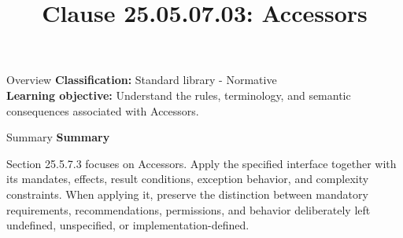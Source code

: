 \documentclass[10pt,letterpaper]{article}
\title{Clause 25.05.07.03: Accessors}
\author{}
\date{}
\begin{document}
\maketitle
\begin{CornellOverviewBox}{Overview}
\textbf{Classification:} Standard library - Normative\\[2pt]
\textbf{Learning objective:} Understand the rules, terminology, and semantic consequences associated with Accessors.
\end{CornellOverviewBox}\begin{CornellSummaryBox}{Summary}
{\sffamily\bfseries\color{Accent} Summary}\par\vspace{3pt}Section 25.5.7.3 focuses on Accessors. Apply the specified interface together with its mandates, effects, result conditions, exception behavior, and complexity constraints. When applying it, preserve the distinction between mandatory requirements, recommendations, permissions, and behavior deliberately left undefined, unspecified, or implementation-defined.
\end{CornellSummaryBox}
\end{document}
